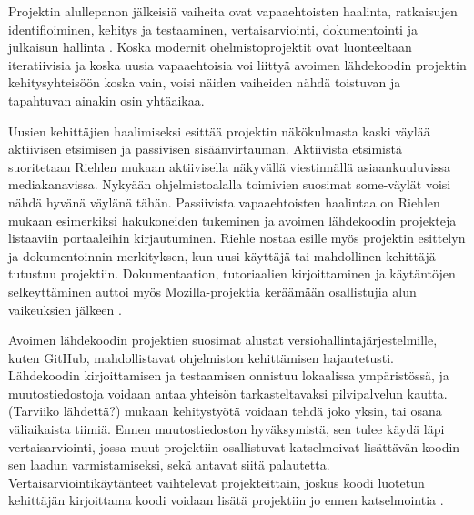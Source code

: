\documentclass[utf8]{gradu3}
\begin{document}
Projektin alullepanon jälkeisiä vaiheita ovat vapaaehtoisten haalinta,
ratkaisujen identifioiminen, kehitys ja testaaminen, vertaisarviointi,
dokumentointi ja julkaisun hallinta \parencite{Sharma-2002}. Koska
modernit ohelmistoprojektit ovat luonteeltaan iteratiivisia ja koska uusia
vapaaehtoisia voi liittyä avoimen lähdekoodin projektin kehitysyhteisöön koska
vain, voisi näiden vaiheiden nähdä toistuvan ja tapahtuvan ainakin osin
yhtäaikaa.

Uusien kehittäjien haalimiseksi \textcite{Riehle-2015} esittää projektin
näkökulmasta kaski väylää aktiivisen etsimisen ja passivisen sisäänvirtauman.
Aktiivista etsimistä suoritetaan Riehlen mukaan aktiivisella näkyvällä
viestinnällä asiaankuuluvissa mediakanavissa. Nykyään ohjelmistoalalla toimivien
suosimat some-väylät voisi nähdä hyvänä väylänä tähän. Passiivista
vapaaehtoisten haalintaa on Riehlen mukaan esimerkiksi hakukoneiden tukeminen ja
avoimen lähdekoodin projekteja listaaviin portaaleihin kirjautuminen. Riehle
nostaa esille myös projektin esittelyn ja dokumentoinnin merkityksen, kun uusi
käyttäjä tai mahdollinen kehittäjä tutustuu projektiin. Dokumentaation,
tutoriaalien kirjoittaminen ja käytäntöjen selkeyttäminen auttoi myös
Mozilla-projektia keräämään osallistujia alun vaikeuksien jälkeen
\parencite{Mockus-2002}.

Avoimen lähdekoodin projektien suosimat alustat versiohallintajärjestelmille,
kuten GitHub, mahdollistavat ohjelmiston kehittämisen hajautetusti. Lähdekoodin
kirjoittamisen ja testaamisen onnistuu lokaalissa ympäristössä, ja
muutostiedostoja voidaan antaa yhteisön tarkasteltavaksi pilvipalvelun kautta.
(Tarviiko lähdettä?) \textcite{Sharma-2002} mukaan kehitystyötä voidaan tehdä
joko yksin, tai osana väliaikaista tiimiä. Ennen muutostiedoston hyväksymistä,
sen tulee käydä läpi vertaisarviointi, jossa muut projektiin osallistuvat
katselmoivat lisättävän koodin sen laadun varmistamiseksi, sekä antavat siitä
palautetta. Vertaisarviointikäytänteet vaihtelevat projekteittain, joskus koodi
luotetun kehittäjän kirjoittama koodi voidaan lisätä projektiin jo ennen
katselmointia \parencite{Wang-2015,Rigby-2008}.

\end{document}
